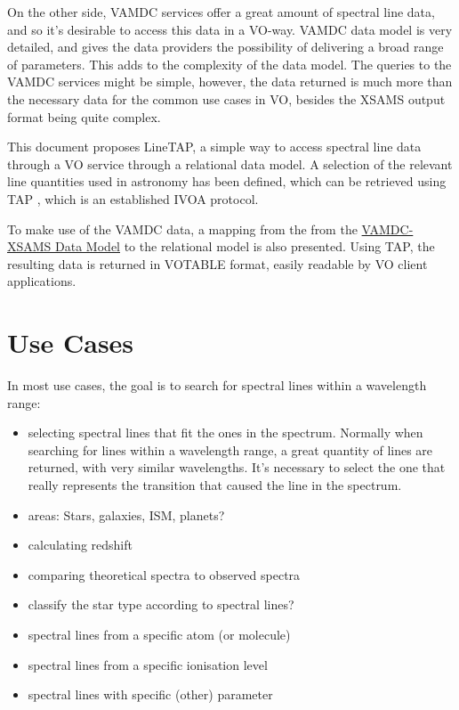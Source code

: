 \documentclass[11pt,a4paper]{ivoa}
\begin{document}
On the other side, VAMDC services offer a great amount of spectral line data, and  so it's 
desirable to access this data in a VO-way. VAMDC data model is very detailed, and gives 
the data providers the possibility of delivering a broad range of parameters. This 
adds to the complexity of the data model.
The queries to the VAMDC services might be simple, however, the data returned is much 
more than the necessary data for the common use cases in VO, besides the XSAMS 
\citep{XSAMS:Docs} output format being quite complex.

This document proposes LineTAP, a simple way to access spectral line data through a VO 
service through a relational data model. A selection of the relevant line quantities used in 
astronomy has been defined, which can be retrieved using TAP \citep{std:TAP}, which is 
an established IVOA protocol. 

To make use of the VAMDC data, a mapping from the from the 
\href{https://standards.vamdc.eu/#data-model}{VAMDC-XSAMS 
Data Model} to the relational model is 
also presented. Using TAP, the resulting data is returned in VOTABLE format,  easily 
readable by VO client applications. 




\section{Use Cases}

In most use cases, the goal is to search for spectral lines within a wavelength range:


\begin{itemize}

\item selecting  spectral lines that fit the ones in the spectrum.
Normally when searching for lines within a wavelength range, a great quantity of lines are 
returned, with very similar wavelengths. It's necessary to select the one that really 
represents the transition that caused the line in the spectrum.
\item areas: Stars, galaxies, ISM, planets?
\item calculating redshift
\item comparing theoretical spectra to observed spectra
\item classify the star type according to spectral lines?
\item spectral lines from a specific atom (or molecule)
\item spectral lines from a specific ionisation level
\item spectral lines with specific (other) parameter
\end{itemize}
\end{document}
